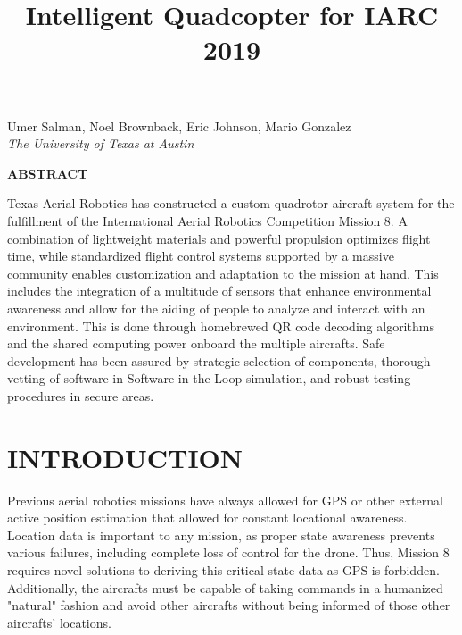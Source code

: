 \documentclass[12pt,letterpaper]{article}
\title{Intelligent Quadcopter for IARC 2019}
\newenvironment{nscenter}
 {\parskip=0pt\par\nopagebreak\centering}
 {\par\noindent\ignorespacesafterend}
\newcommand{\affiliatedauthor}[2]{
\begin{nscenter}
	#1 \\ \textit{#2}
\end{nscenter}
}
\renewcommand{\abstractname}{ABSTRACT}
\renewenvironment{abstract}
 {\vspace{-0.5ex}
	\small
	\begin{center}
		\bfseries \abstractname\vspace{-4ex}\vspace{0pt}
	\end{center}
	\list{}{
		\setlength{\leftmargin}{0.5in}
		\setlength{\rightmargin}{\leftmargin}
	}
	\item\relax}
 {\endlist}
\begin{document}
\begin{center}
	\textbf{\LARGE{\thetitle}}
\end{center}

\affiliatedauthor{Umer Salman, Noel Brownback, Eric Johnson, Mario Gonzalez}{The University of Texas at Austin}


\begin{abstract}
	Texas Aerial Robotics has constructed a custom quadrotor aircraft system for the fulfillment of the International Aerial Robotics Competition Mission 8. A combination of lightweight materials and powerful propulsion optimizes flight time, while standardized flight control systems supported by a massive community enables customization and adaptation to the mission at hand. This includes the integration of a multitude of sensors that enhance environmental awareness and allow for the aiding of people to analyze and interact with an environment. This is done through homebrewed QR code decoding algorithms and the shared computing power onboard the multiple aircrafts. Safe development has been assured by strategic selection of components, thorough vetting of software in Software in the Loop simulation, and robust testing procedures in secure areas.
\end{abstract}


\section*{INTRODUCTION}
	Previous aerial robotics missions have always allowed for GPS or other external active position estimation that allowed for constant locational awareness. Location data is important to any mission, as proper state awareness prevents various failures, including complete loss of control for the drone. Thus, Mission 8 requires novel solutions to deriving this critical state data as GPS is forbidden. Additionally, the aircrafts must be capable of taking commands in a humanized "natural" fashion and avoid other aircrafts without being informed of those other aircrafts' locations.
\end{document}
